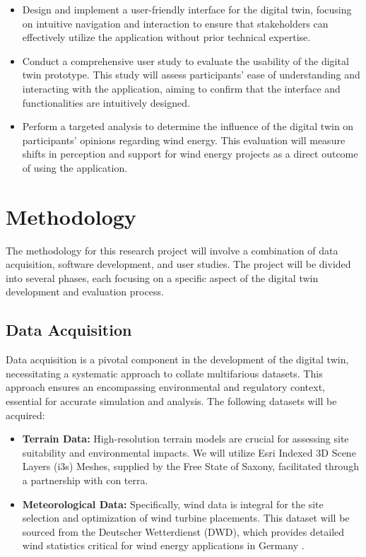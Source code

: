 \documentclass[11pt, titlepage, a4paper]{article}
\begin{document}
\begin{linenumbers}
\begin{itemize}[label={--}]
        \item  Design and implement a user-friendly interface for the digital twin, focusing on intuitive navigation and interaction to ensure that stakeholders can effectively utilize the application without prior technical expertise.
        \item Conduct a comprehensive user study to evaluate the usability of the digital twin prototype. This study will assess participants' ease of understanding and interacting with the application, aiming to confirm that the interface and functionalities are intuitively designed.
        \item Perform a targeted analysis to determine the influence of the digital twin on participants' opinions regarding wind energy. This evaluation will measure shifts in perception and support for wind energy projects as a direct outcome of using the application.
    \end{itemize}


    \section{Methodology}
    The methodology for this research project will involve a combination of data acquisition, software development, and user studies. The project will be divided into several phases, each focusing on a specific aspect of the digital twin development and evaluation process.
    \subsection{Data Acquisition}

    Data acquisition is a pivotal component in the development of the digital twin, necessitating a systematic approach to collate multifarious datasets. This approach ensures an encompassing environmental and regulatory context, essential for accurate simulation and analysis. The following datasets will be acquired:

    \begin{itemize}
        \item \textbf{Terrain Data:} High-resolution terrain models are crucial for assessing site suitability and environmental impacts. We will utilize Esri Indexed 3D Scene Layers (i3s) Meshes, supplied by the Free State of Saxony, facilitated through a partnership with con terra.

        \item \textbf{Meteorological Data:} Specifically, wind data is integral for the site selection and optimization of wind turbine placements. This dataset will be sourced from the Deutscher Wetterdienst (DWD), which provides detailed wind statistics critical for wind energy applications in Germany \cite{deutscherwetterdienstWinddatenFurWindenergienutzer}.


\end{itemize}
\end{linenumbers}
\end{document}
